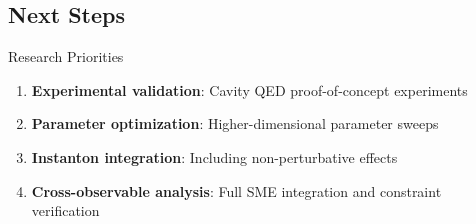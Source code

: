 \documentclass[12pt]{article}
\begin{document}
\subsection{Next Steps}

\begin{warningbox}{Research Priorities}
\begin{enumerate}
\item \textbf{Experimental validation}: Cavity QED proof-of-concept experiments
\item \textbf{Parameter optimization}: Higher-dimensional parameter sweeps
\item \textbf{Instanton integration}: Including non-perturbative effects
\item \textbf{Cross-observable analysis}: Full SME integration and constraint verification
\end{enumerate}
\end{warningbox}



\end{document}

